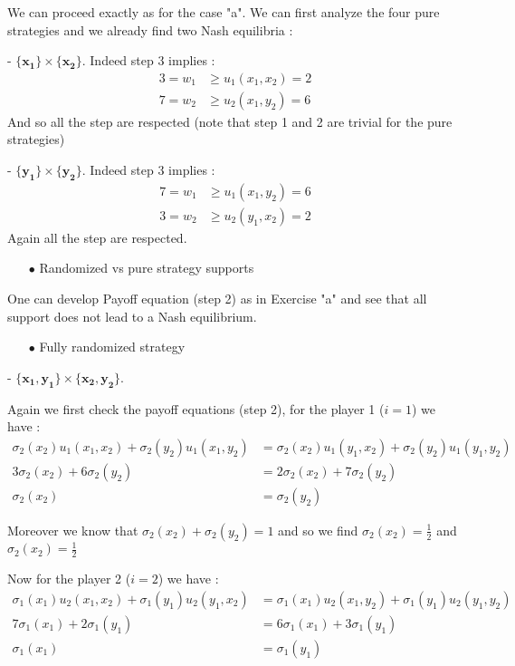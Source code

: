 We can proceed exactly as for the case "a". We can first analyze the four pure strategies and we already find two Nash equilibria :

- $\mathbf{\{x_1\}}\times\mathbf{\{x_2\}}$. Indeed step 3 implies :
\begin{align*}
    3 =w_1&\ge u_1(x_1,x_2)=2 \\
    7=w_2&\ge u_2(x_1,y_2)=6 
\end{align*}
And so all the step are respected (note that step 1 and 2 are trivial for the pure strategies) 

- $\mathbf{\{y_1\}}\times\mathbf{\{y_2\}}$. Indeed step 3 implies :
\begin{align*}
    7 =w_1&\ge u_1(x_1,y_2)=6 \\
    3=w_2&\ge u_2(y_1,x_2)=2
\end{align*}
Again all the step are respected.


\begin{itemize}
  \item[$\bullet$] Randomized vs pure strategy supports
\end{itemize}

One can develop Payoff equation (step 2) as in Exercise "a" and see that all support does not lead to a Nash equilibrium.

\begin{itemize}
  \item[$\bullet$] Fully randomized strategy 
\end{itemize}
- $\mathbf{\{x_1,y_1\}}\times\mathbf{\{x_2,y_2\}}$.

Again we first check the payoff equations (step 2), for the player 1 ($i=1$) we have : 
\begin{align*}
 \sigma_2(x_2)u_1(x_1,x_2) + \sigma_2(y_2)u_1(x_1,y_2) &= \sigma_2(x_2)u_1(y_1,x_2) + \sigma_2(y_2)u_1(y_1,y_2) \\
 3\sigma_2(x_2)+6\sigma_2(y_2)&= 2\sigma_2(x_2) + 7\sigma_2(y_2) \\
 \sigma_2(x_2)&=\sigma_2(y_2)
\end{align*}

Moreover we know that $\sigma_2(x_2) + \sigma_2(y_2) = 1$ and so we find $\sigma_2(x_2)=\frac{1}{2}$ and $\sigma_2(x_2)=\frac{1}{2}$

Now for the player 2 ($i=2$) we have : 
\begin{align*}
 \sigma_1(x_1)u_2(x_1,x_2) + \sigma_1(y_1)u_2(y_1,x_2) &= \sigma_1(x_1)u_2(x_1,y_2) + \sigma_1(y_1)u_2(y_1,y_2) \\
 7\sigma_1(x_1)+2\sigma_1(y_1)&= 6\sigma_1(x_1) + 3\sigma_1(y_1) \\
 \sigma_1(x_1)&=\sigma_1(y_1)
\end{align*}

